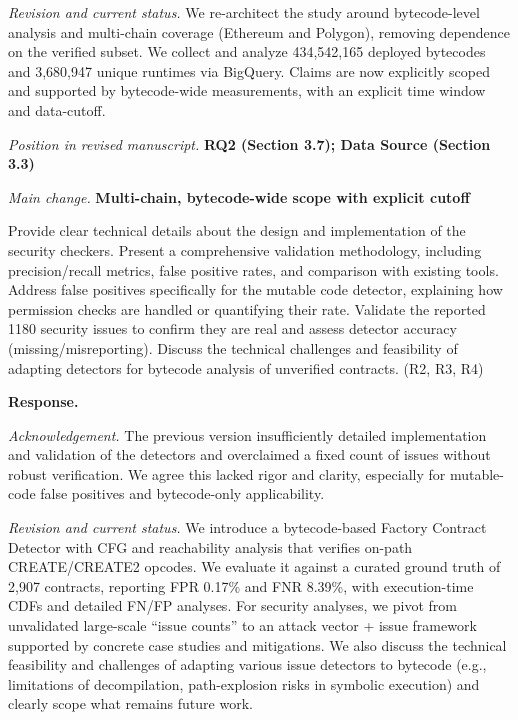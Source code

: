 \documentclass[acmsmall]{acmart}
\begin{document}
	\textit{Revision and current status.} We re-architect the study around bytecode-level analysis
	and multi-chain coverage (Ethereum and Polygon), removing dependence on the verified subset. We
	collect and analyze 434,542,165 deployed bytecodes and 3,680,947 unique runtimes via BigQuery. Claims
	are now explicitly scoped and supported by bytecode-wide measurements, with an explicit time
	window and data-cutoff.

	\vspace{0.25em}
	\textit{Position in revised manuscript.} {\color{red}\textbf{RQ2 (Section 3.7); Data Source (Section 3.3)}}

	\textit{Main change.} {\color{blue}\textbf{Multi-chain, bytecode-wide scope with explicit cutoff}}

	\begin{tcolorbox}
		[commentbox,title=Editor/AE -- Comment 2] Provide clear technical details about the design
		and implementation of the security checkers. Present a comprehensive validation methodology,
		including precision/recall metrics, false positive rates, and comparison with existing tools.
		Address false positives specifically for the mutable code detector, explaining how
		permission checks are handled or quantifying their rate. Validate the reported 1180 security
		issues to confirm they are real and assess detector accuracy (missing/misreporting). Discuss
		the technical challenges and feasibility of adapting detectors for bytecode analysis of
		unverified contracts. (R2, R3, R4)
	\end{tcolorbox}

	\noindent
	\textbf{Response.}

	\textit{Acknowledgement.} The previous version insufficiently detailed implementation and
	validation of the detectors and overclaimed a fixed count of issues without robust verification.
	We agree this lacked rigor and clarity, especially for mutable-code false positives and bytecode-only
	applicability.

	\textit{Revision and current status.} We introduce a bytecode-based Factory Contract Detector with
	CFG and reachability analysis that verifies on-path CREATE/CREATE2 opcodes. We evaluate it
	against a curated ground truth of 2,907 contracts, reporting FPR 0.17\% and FNR 8.39\%, with
	execution-time CDFs and detailed FN/FP analyses. For security analyses, we pivot from
	unvalidated large-scale “issue counts” to an attack vector + issue framework supported by
	concrete case studies and mitigations. We also discuss the technical feasibility and challenges of
	adapting various issue detectors to bytecode (e.g., limitations of decompilation, path-explosion
	risks in symbolic execution) and clearly scope what remains future work.
\end{document}
